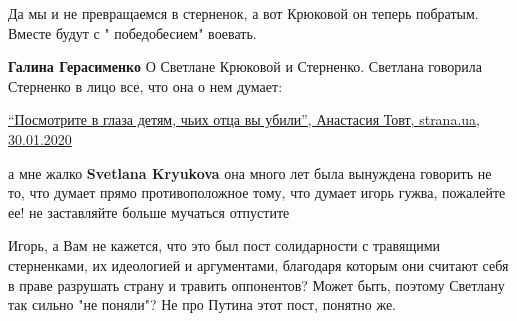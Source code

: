 \begin{itemize}
Да мы и не превращаемся в стерненок, а вот Крюковой он теперь побратым. Вместе
будут с " победобесием" воевать.

\begin{itemize}
 
\textbf{Галина Герасименко}
О Светлане Крюковой и Стерненко. Светлана говорила Стерненко в лицо все, что она о нем думает:

\href{https://strana.ua/articles/special/247259-kak-poruhalis-radikal-serhej-sternenko-i-zhurnalist-svetlana-krjukova.html}{%
\enquote{Посмотрите в глаза детям, чьих отца вы убили}, Анастасия Товт, strana.ua, 30.01.2020%
}

\end{itemize}

 
а мне жалко \textbf{Svetlana Kryukova}
она много лет была вынуждена говорить не то, что думает
прямо противоположное тому, что думает
игорь гужва, пожалейте ее! не заставляйте больше мучаться
отпустите

 

Игорь, а Вам не кажется, что это был пост солидарности с травящими стерненками,
их идеологией и аргументами, благодаря которым они считают себя в праве
разрушать страну и травить оппонентов? Может быть, поэтому Светлану так сильно
"не поняли"? Не про Путина этот пост, понятно же.

\begin{itemize}

 

\end{itemize}
\end{itemize}
